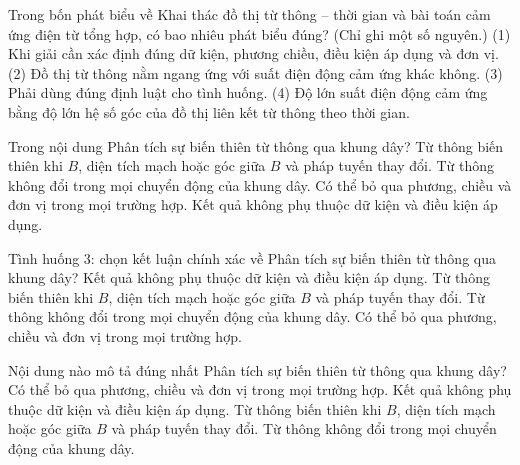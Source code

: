 \begin{ex}
Trong bốn phát biểu về Khai thác đồ thị từ thông – thời gian và bài toán cảm ứng điện từ tổng hợp, có bao nhiêu phát biểu đúng? (Chỉ ghi một số nguyên.) (1) Khi giải cần xác định đúng dữ kiện, phương chiều, điều kiện áp dụng và đơn vị. (2) Đồ thị từ thông nằm ngang ứng với suất điện động cảm ứng khác không. (3) Phải dùng đúng định luật cho tình huống. (4) Độ lớn suất điện động cảm ứng bằng độ lớn hệ số góc của đồ thị liên kết từ thông theo thời gian.
\end{ex}

\begin{ex}
Trong nội dung Phân tích sự biến thiên từ thông qua khung dây?
\choice
{\True Từ thông biến thiên khi $B$, diện tích mạch hoặc góc giữa $B$ và pháp tuyến thay đổi.}
{Từ thông không đổi trong mọi chuyển động của khung dây.}
{Có thể bỏ qua phương, chiều và đơn vị trong mọi trường hợp.}
{Kết quả không phụ thuộc dữ kiện và điều kiện áp dụng.}
\end{ex}

\begin{ex}
Tình huống 3: chọn kết luận chính xác về Phân tích sự biến thiên từ thông qua khung dây?
\choice
{Kết quả không phụ thuộc dữ kiện và điều kiện áp dụng.}
{\True Từ thông biến thiên khi $B$, diện tích mạch hoặc góc giữa $B$ và pháp tuyến thay đổi.}
{Từ thông không đổi trong mọi chuyển động của khung dây.}
{Có thể bỏ qua phương, chiều và đơn vị trong mọi trường hợp.}
\end{ex}

\begin{ex}
Nội dung nào mô tả đúng nhất Phân tích sự biến thiên từ thông qua khung dây?
\choice
{Có thể bỏ qua phương, chiều và đơn vị trong mọi trường hợp.}
{Kết quả không phụ thuộc dữ kiện và điều kiện áp dụng.}
{\True Từ thông biến thiên khi $B$, diện tích mạch hoặc góc giữa $B$ và pháp tuyến thay đổi.}
{Từ thông không đổi trong mọi chuyển động của khung dây.}
\end{ex}

